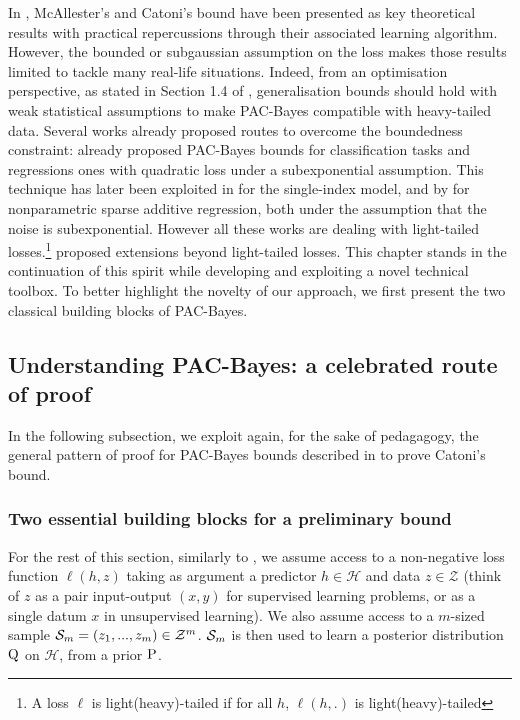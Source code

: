 In , McAllester's and Catoni's bound \citep{mcallester2003pac,catoni2007pac} have been presented as key theoretical results with practical repercussions through their associated learning algorithm. However, the bounded or subgaussian assumption on the loss makes those results limited to tackle many real-life situations.
Indeed, from an optimisation perspective, as stated in Section 1.4 of , generalisation bounds should hold with weak statistical assumptions to make PAC-Bayes compatible with heavy-tailed data. Several works already proposed routes to overcome the boundedness constraint:  \citet[][Chapter 5]{catoni2004statistical} already proposed PAC-Bayes bounds for classification tasks and regressions ones with quadratic loss under a subexponential assumption. This technique has later been exploited in \citet{alquier2013sparse} for the single-index model, and by \citet{guedj2013pac} for nonparametric sparse additive regression, both under the assumption that the noise is subexponential. However all these works are dealing with light-tailed losses.\footnote{A loss $\ell$ is light(heavy)-tailed if for all $h$, $\ell(h,.)$ is light(heavy)-tailed}
\citet{alquier2018simpler,holland2019pac, kuzborskij2019efron, haddouche2021pac} proposed extensions beyond light-tailed losses.
This chapter stands in the continuation of this spirit while developing and exploiting a novel technical toolbox.
To better highlight the novelty of our approach, we first present the two classical building blocks of PAC-Bayes.

\subsection{Understanding PAC-Bayes: a celebrated route of proof}
In the following subsection, we exploit again, for the sake of pedagagogy, the general pattern of proof for PAC-Bayes bounds described in  to prove Catoni's bound. 
\subsubsection{Two essential building blocks for a preliminary bound}

For the rest of this section, similarly to , we assume access to a non-negative loss function $\ell(h,z)$ taking as argument a predictor $h\in\mathcal{H}$  and data $z\in\mathcal{Z}$ (think of $z$ as a pair input-output $(x,y)$ for supervised learning problems, or as a single datum $x$ in unsupervised learning). We also assume access to a $m$-sized sample $\Sm= (z_1,...,z_m)\in\mathcal{Z}^m$. $\Sm$ is then used to learn a posterior distribution $\Q$ on $\mathcal{H}$, from a prior $\P$.

